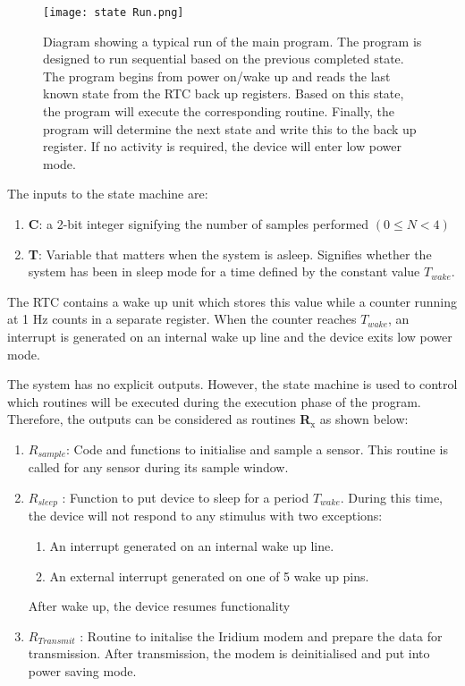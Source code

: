 \begin{figure}[H]
	\centering
	\texttt{[image: state Run.png]}
	\caption{Diagram showing a typical run of the main program. The program is designed to run sequential based on the previous completed state. The program begins from power on/wake up and reads the last known state from the RTC back up registers. Based on this state, the program will execute the corresponding routine. Finally, the program will determine the next state and write this to the back up register. If no activity is required, the device will enter low power mode.}
	\label{fig:state_run}
\end{figure}

The inputs to the state machine are:
\begin{enumerate}
	\item \textbf{C}: a 2-bit integer signifying the number of samples performed $(0 \leq N <4)$
	\item \textbf{T}: Variable that matters when the system is asleep. Signifies whether the system has been in sleep mode for a time defined by the constant value $T_{wake}$. 
\end{enumerate}
The RTC contains a wake up unit which stores this value while a counter running at 1 Hz counts in a separate register. When the counter reaches $T_{wake}$, an interrupt is generated on an internal wake up line and the device exits low power mode. \par
The system has no explicit outputs. However, the state machine is used to control which routines will be executed during the execution phase of the program. Therefore, the outputs can be considered as routines \textbf{R$_\text{x}$} as shown below:

\begin{enumerate}
	\item $R_{sample}$: Code and functions to initialise and sample a sensor. This routine is called for any sensor during its sample window.
	\item $R_{sleep}$ : Function to put device to sleep for a period $T_{wake}$. During this time, the device will not respond to any stimulus with two exceptions:
		\begin{enumerate}
			\item An interrupt generated on an internal wake up line.
			\item An external interrupt generated on one of 5 wake up pins.
		\end{enumerate} After wake up, the device resumes functionality
	\item $R_{Transmit}$ : Routine to initalise the Iridium modem and prepare the data for transmission. After transmission, the modem is deinitialised and put into power saving mode.
\end{enumerate}

